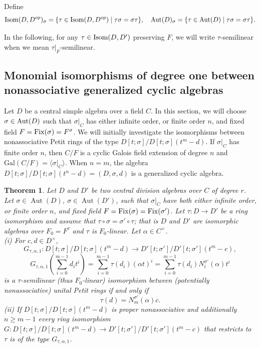 \documentclass{amsart}
\theoremstyle{plain}
\newtheorem{theorem}{Theorem}[section]
\theoremstyle{definition}
\numberwithin{equation}{section}
\numberwithin{figure}{section}
\DeclareMathOperator{\Aut}{Aut}
\begin{document}
 Define
$$
{\rm Isom}(D, D^{op})_\sigma=\{\tau\in {\rm Isom}(D,D^{op}) \mid \tau \sigma = \sigma \tau \},\quad {\rm Aut}(D)_\sigma=\{\tau\in {\rm Aut}(D) \mid \tau \sigma = \sigma \tau \}.
$$

In the following, for any $\tau\in {\rm Isom}(D, D')$ preserving $F$, we will write  $\tau$-semilinear when we mean $\tau|_F$-semilinear.

\subsection{Monomial  isomorphisms of degree one between nonassociative generalized cyclic algebras}

Let $D$ be a central simple algebra over a field $C$. In this section, we will choose
$\sigma\in {\rm Aut}(D)$ such that $\sigma|_{C}$ has either infinite order, or finite order $n$,  and fixed field $F={\rm Fix}(\sigma)=F^\sigma$. We will initially investigate the isomorphisms between  nonassociative Petit rings of the type $D[t;\sigma]/D[t;\sigma](t^m-d)$.
If $\sigma|_C$ has finite order $n$, then $C/F$ is a cyclic Galois field extension of
 degree $n$ and $\mathrm{Gal}(C/F) = \langle \sigma |_{C} \rangle$. When $n=m$, the algebra $D[t;\sigma]/D[t;\sigma](t^n -d)=(D,\sigma,d)$ is a generalized cyclic algebra.


 \begin{theorem} \label{thm:aut2}
Let $D$ and $D'$ be two central division algebras over $C$ of degree $r$. Let $\sigma\in \Aut (D)$, $\sigma\in \Aut (D')$,
such that $\sigma|_{C}$ have both either infinite order, or finite order $n$,  and fixed field $F={\rm Fix}(\sigma)={\rm Fix}(\sigma')$.
 Let $\tau:D\to D'$ be a ring isomorphism and assume that $\tau\circ\sigma=\sigma'\circ \tau$; that is $D$ and $D'$ are isomorphic algebras over  $F_0=F^\tau$ and  $\tau$ is  $F_0$-linear. Let  $\alpha\in C^\times$.
 \\ (i) For $c,d\in D^\times$,
   $$ G_{\tau,\alpha,1}: D[t;\sigma]/D[t;\sigma](t^m-d)\to D'[t;\sigma']/D'[t;\sigma'](t^m-c),$$
   $$G_{\tau,\alpha,1}(\sum_{i=0}^{m-1}d_it^i)=\sum_{i=0}^{m-1}\tau(d_i) (\alpha t)^i= \sum_{i=0}^{m-1}\tau(d_i) N_i^{\sigma'}(\alpha) t^i $$
    is a $\tau$-semilinear (thus $F_0$-linear) isomorphism between (potentially nonassociative) unital Petit rings if and only if
$$\tau(d) =N^{\sigma'}_{m}(\alpha) c.$$
(ii) If $D[t;\sigma]/D[t;\sigma](t^m-d)$ is proper nonassociative and additionally $n\geq m-1$  every ring isomorphism $G:D[t;\sigma]/D[t;\sigma](t^m-d)\to D'[t;\sigma']/D'[t;\sigma'](t^m-c)$ that restricts to
 $\tau$  is of the type $ G_{\tau,\alpha,1}$.
\end{theorem}
\end{document}
